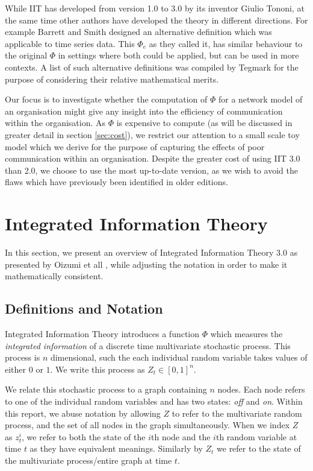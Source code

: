 While IIT has developed from version 1.0 to 3.0 by its inventor Giulio Tononi, at the same time other authors have developed the theory in different directions. For example Barrett and Smith \cite{barrett2011practical} designed an alternative definition which was applicable to time series data. This $\Phi_e$ as they called it, has similar behaviour to the original $\Phi$ in settings where both could be applied, but can be used in more contexts. A list of such alternative definitions was compiled by Tegmark \cite{tegmark2016improved} for the purpose of considering their relative mathematical merits.

Our focus is to investigate whether the computation of $\Phi$ for a network model of an organisation might give any insight into the efficiency of communication within the organisation. As $\Phi$ is expensive to compute (as will be discussed in greater detail in section \ref{sec:cost}), we restrict our attention to a small scale toy model which we derive for the purpose of capturing the effects of poor communication within an organisation. Despite the greater cost of using IIT 3.0 than 2.0, we choose to use the most up-to-date version, as we wish to avoid the flaws which have previously been identified in older editions.

\section{Integrated Information Theory}
\label{sec:iit}

In this section, we present an overview of Integrated Information Theory 3.0 as presented by Oizumi et all \cite{oizumi2014phenomenology}, while adjusting the notation in order to make it mathematically consistent.
	
\subsection{Definitions and Notation}

Integrated Information Theory introduces a function $\Phi$ which measures the \textit{integrated information} of a discrete time multivariate stochastic process. This process is $n$ dimensional, such the each individual random variable takes values of either $0$ or $1$. We write this process as $Z_t \in [0,1]^n$. 

We relate this stochastic process to a graph containing $n$ nodes. Each node refers to one of the individual random variables and has two states: \textit{off}  and \textit{on}. Within this report, we abuse notation by allowing $Z$ to refer to the multivariate random process, and the set of all nodes in the graph simultaneously. When we index $Z$ as $z^i_t$, we refer to both the state of the $i$th node and the $i$th random variable at time $t$ as they have equivalent meanings. Similarly by $Z_t$ we refer to the state of the multivariate process/entire graph at time $t$. 

